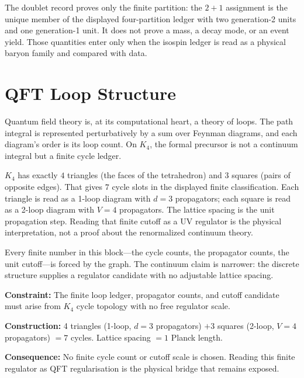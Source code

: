 \documentclass[11pt,a4paper]{book}
\newcommand{\VoidRef}[2]{\textit{#2} (in \textit{Void})}
\begin{document}
The doublet record proves only the finite partition: the $2+1$ assignment is
the unique member of the displayed four-partition ledger with two generation-2
units and one generation-1 unit.  It does not prove a mass, a decay mode, or an
event yield.  Those quantities enter only when the isospin ledger is read as a
physical baryon family and compared with data.

\chapter{QFT Loop Structure}
\label{ch:qft-loops}

Quantum field theory is, at its computational heart, a theory of loops. The path integral is represented perturbatively by a sum over Feynman diagrams, and each diagram's order is its loop count. On $K_4$, the formal precursor is not a continuum integral but a finite cycle ledger.

$K_4$ has exactly $4$ triangles (the faces of the tetrahedron) and $3$ squares (pairs of opposite edges). That gives $7$ cycle slots in the displayed finite classification. Each triangle is read as a 1-loop diagram with $d = 3$ propagators; each square is read as a 2-loop diagram with $V = 4$ propagators. The lattice spacing is the unit propagation step. Reading that finite cutoff as a UV regulator is the physical interpretation, not a proof about the renormalized continuum theory.

Every finite number in this block---the cycle counts, the propagator counts, the unit cutoff---is forced by the graph. The continuum claim is narrower: the discrete structure supplies a regulator candidate with no adjustable lattice spacing.


\textbf{Constraint:} The finite loop ledger, propagator counts, and cutoff candidate must arise from $K_4$ cycle topology with no free regulator scale.

\textbf{Construction:} 4 triangles (1-loop, $d = 3$ propagators) $+ 3$ squares (2-loop, $V = 4$ propagators) $= 7$ cycles. Lattice spacing $= 1$ Planck length.

\textbf{Consequence:} No finite cycle count or cutoff scale is chosen. Reading this finite regulator as QFT regularisation is the physical bridge that remains exposed.
\end{document}
